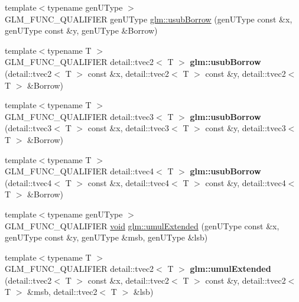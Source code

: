 \begin{DoxyCompactItemize}
\item 
{\footnotesize template$<$typename gen\+U\+Type $>$ }\\G\+L\+M\+\_\+\+F\+U\+N\+C\+\_\+\+Q\+U\+A\+L\+I\+F\+I\+E\+R gen\+U\+Type \hyperlink{group__core__func__integer_gae5b4a6cefd1e21fd2e1b8526b4c964a7}{glm\+::usub\+Borrow} (gen\+U\+Type const \&x, gen\+U\+Type const \&y, gen\+U\+Type \&Borrow)
\item 
\hypertarget{namespaceglm_a532498a426298055126dff6955e00e06}{}{\footnotesize template$<$typename T $>$ }\\G\+L\+M\+\_\+\+F\+U\+N\+C\+\_\+\+Q\+U\+A\+L\+I\+F\+I\+E\+R detail\+::tvec2$<$ T $>$ {\bfseries glm\+::usub\+Borrow} (detail\+::tvec2$<$ T $>$ const \&x, detail\+::tvec2$<$ T $>$ const \&y, detail\+::tvec2$<$ T $>$ \&Borrow)\label{namespaceglm_a532498a426298055126dff6955e00e06}

\item 
\hypertarget{namespaceglm_a610ad53d0c72bd94246246036a3d5b0a}{}{\footnotesize template$<$typename T $>$ }\\G\+L\+M\+\_\+\+F\+U\+N\+C\+\_\+\+Q\+U\+A\+L\+I\+F\+I\+E\+R detail\+::tvec3$<$ T $>$ {\bfseries glm\+::usub\+Borrow} (detail\+::tvec3$<$ T $>$ const \&x, detail\+::tvec3$<$ T $>$ const \&y, detail\+::tvec3$<$ T $>$ \&Borrow)\label{namespaceglm_a610ad53d0c72bd94246246036a3d5b0a}

\item 
\hypertarget{namespaceglm_aafb35ca5600ad9f1e550d9c801929c52}{}{\footnotesize template$<$typename T $>$ }\\G\+L\+M\+\_\+\+F\+U\+N\+C\+\_\+\+Q\+U\+A\+L\+I\+F\+I\+E\+R detail\+::tvec4$<$ T $>$ {\bfseries glm\+::usub\+Borrow} (detail\+::tvec4$<$ T $>$ const \&x, detail\+::tvec4$<$ T $>$ const \&y, detail\+::tvec4$<$ T $>$ \&Borrow)\label{namespaceglm_aafb35ca5600ad9f1e550d9c801929c52}

\item 
{\footnotesize template$<$typename gen\+U\+Type $>$ }\\G\+L\+M\+\_\+\+F\+U\+N\+C\+\_\+\+Q\+U\+A\+L\+I\+F\+I\+E\+R \hyperlink{_s_d_l__audio_8h_a52835ae37c4bb905b903cbaf5d04b05f}{void} \hyperlink{group__core__func__integer_gad991bf53779a4309a920bb7bfcf2639c}{glm\+::umul\+Extended} (gen\+U\+Type const \&x, gen\+U\+Type const \&y, gen\+U\+Type \&msb, gen\+U\+Type \&lsb)
\item 
\hypertarget{namespaceglm_afd73bd0bfe3b486ad3609a4f3b335a92}{}{\footnotesize template$<$typename T $>$ }\\G\+L\+M\+\_\+\+F\+U\+N\+C\+\_\+\+Q\+U\+A\+L\+I\+F\+I\+E\+R detail\+::tvec2$<$ T $>$ {\bfseries glm\+::umul\+Extended} (detail\+::tvec2$<$ T $>$ const \&x, detail\+::tvec2$<$ T $>$ const \&y, detail\+::tvec2$<$ T $>$ \&msb, detail\+::tvec2$<$ T $>$ \&lsb)\label{namespaceglm_afd73bd0bfe3b486ad3609a4f3b335a92}


\end{DoxyCompactItemize}
